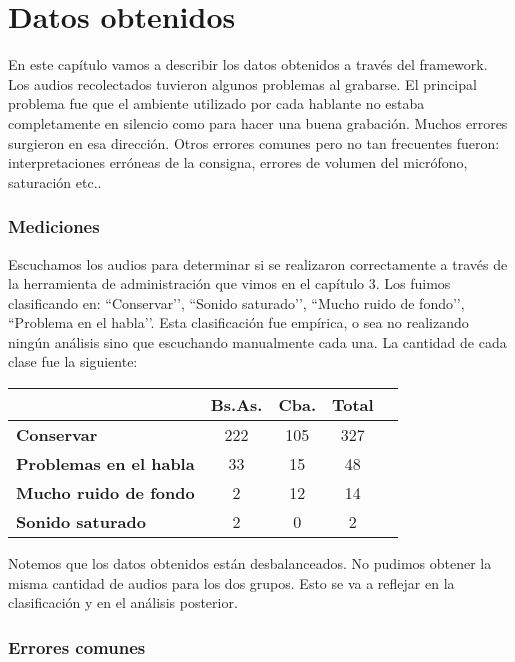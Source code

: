 \chapter{Datos obtenidos}

En este capítulo vamos a describir los datos obtenidos a través del framework. Los audios recolectados tuvieron algunos problemas al grabarse. El principal problema fue que el ambiente utilizado por cada hablante no estaba completamente en silencio como para hacer una buena grabación. Muchos errores surgieron en esa dirección. Otros errores comunes pero no tan frecuentes fueron: interpretaciones erróneas de la consigna, errores de volumen del micrófono, saturación etc.. 

\subsection{Mediciones}

Escuchamos los audios para determinar si se realizaron correctamente a través de la herramienta de administración que vimos en el capítulo 3. Los fuimos clasificando en: ``Conservar’’, ``Sonido saturado’’, ``Mucho ruido de fondo’’, ``Problema en el habla’’. Esta clasificación fue empírica, o sea no realizando ningún análisis sino que escuchando manualmente cada una. La cantidad de cada clase fue la siguiente:

\begin{table}[h]
\centering
\begin{tabular}{|l|c|c|c|c|}
\hline
\textbf{}  & \textbf{Bs.As. } & \textbf{Cba.} & \textbf{Total} \\ \hline
\textbf{Conservar}  & 222 & 105 & 327 \\ \hline
\textbf{Problemas en el habla}  & 33 & 15 & 48 \\ \hline
\textbf{Mucho ruido de fondo}  & 2 & 12 & 14 \\ \hline
\textbf{Sonido saturado}  & 2 & 0 & 2 \\ \hline
\end{tabular}
\end{table}

Notemos que los datos obtenidos están desbalanceados. No pudimos obtener la misma cantidad de audios para los dos grupos. Esto se va a reflejar en la clasificación y en el análisis posterior.

\subsection{Errores comunes}

